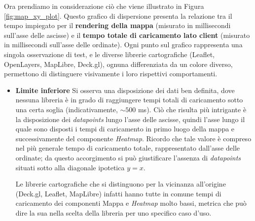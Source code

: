 Ora prendiamo in considerazione ciò che viene illustrato in Figura \ref{fig:map_xy_plot}. Questo  grafico di dispersione presenta la relazione tra il tempo impiegato per il \textbf{rendering della mappa} (misurato in millisecondi sull'asse delle ascisse) e il \textbf{tempo totale di caricamento lato client} (misurato in millisecondi sull'asse delle ordinate). Ogni punto sul grafico rappresenta una singola osservazione di test, e le diverse librerie cartografiche (Leaflet, OpenLayers, MapLibre, Deck.gl), ognuna differenziata da un colore diverso, permettono di distinguere visivamente i loro rispettivi comportamenti.

\begin{itemize}
    \item \textbf{Limite inferiore}
    Si osserva una disposizione dei dati ben definita, dove nessuna libreria è in grado di raggiungere tempi totali di caricamento sotto una certa soglia (indicativamente, $\sim 500$ ms). Ciò che risulta più intrigante è la disposizione dei \textit{datapoints} lungo l'asse delle ascisse, quindi l'asse lungo il quale sono disposti i tempi di caricamento in primo luogo della mappa e successivamente del componente \textit{Heatmap}. Ricordo che tale valore è compreso nel più generale tempo di caricamento totale, rappresentato dall'asse delle ordinate; da questo accorgimento si può giustificare l'assenza di \textit{datapoints} situati sotto alla diagonale ipotetica $y=x$.
    
    Le librerie cartografiche che si distinguono per la vicinanza all'origine (Deck.gl, Leaflet, MapLibre) infatti hanno tutte in comune tempi di caricamento dei componenti Mappa e \textit{Heatmap} molto bassi, metrica che può dire la sua nella scelta della libreria per uno specifico caso d'uso.


\end{itemize}
